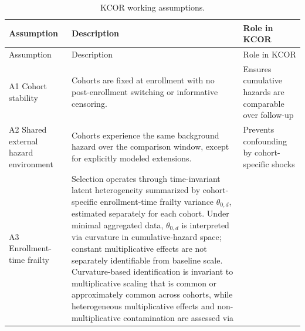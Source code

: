 \documentclass[
]{article}
\begin{document}
\begin{longtable}[]{@{}
  >{\raggedright\arraybackslash}p{}
  >{\raggedright\arraybackslash}p{}
  >{\raggedright\arraybackslash}p{}@{}}
\caption{KCOR working
assumptions.}\label{tbl:si_assumptions}\tabularnewline
\toprule\noalign{}
\begin{minipage}[b]{\linewidth}\raggedright
Assumption
\end{minipage} & \begin{minipage}[b]{\linewidth}\raggedright
Description
\end{minipage} & \begin{minipage}[b]{\linewidth}\raggedright
Role in KCOR
\end{minipage} \\
\midrule\noalign{}
\endfirsthead
\toprule\noalign{}
\begin{minipage}[b]{\linewidth}\raggedright
Assumption
\end{minipage} & \begin{minipage}[b]{\linewidth}\raggedright
Description
\end{minipage} & \begin{minipage}[b]{\linewidth}\raggedright
Role in KCOR
\end{minipage} \\
\midrule\noalign{}
\endhead
\bottomrule\noalign{}
\endlastfoot
A1 Cohort stability & Cohorts are fixed at enrollment with no
post-enrollment switching or informative censoring. & Ensures cumulative
hazards are comparable over follow-up \\
A2 Shared external hazard environment & Cohorts experience the same
background hazard over the comparison window, except for explicitly
modeled extensions. & Prevents confounding by cohort-specific shocks \\
A3 Enrollment-time frailty & Selection operates through time-invariant
latent heterogeneity summarized by cohort-specific enrollment-time
frailty variance \(\theta_{0,d}\), estimated separately for each cohort.
Under minimal aggregated data, \(\theta_{0,d}\) is interpreted via
curvature in cumulative-hazard space; constant multiplicative effects
are not separately identifiable from baseline scale. Curvature-based
identification is invariant to multiplicative scaling that is common or
approximately common across cohorts, while heterogeneous multiplicative
effects and non-multiplicative contamination are assessed via

\end{longtable}
\end{document}
